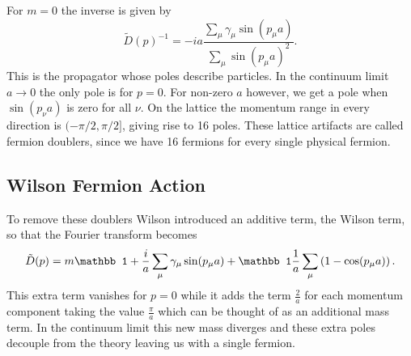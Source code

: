 For $m=0$ the inverse is given by
\begin{equation}
    \tilde D(p)^{-1}=-ia\frac{\sum_\mu\gamma_\mu\sin(p_\mu a)}{\sum_\mu\sin(p_\mu a)^2}.
\end{equation}
This is the propagator whose poles describe particles. In the continuum limit $a\to0$ the only pole is for $p=0$. For non-zero $a$ however, we get a pole when $\sin(p_\nu a)$ is zero for all $\nu$. On the lattice the momentum range in every direction is $(-\pi/2,\pi/2]$, giving rise to 16 poles. These lattice artifacts are called fermion doublers, since we have 16 fermions for every single physical fermion\cite{gattringer}. 


\subsection{Wilson Fermion Action}
To remove these doublers Wilson introduced an additive term, the Wilson term, so that the Fourier transform becomes
\begin{equation}
    \tilde D(p)=m\mathbb1+\frac{i}{a}\sum_\mu\gamma_\mu\sin(p_\mu a)+\mathbb1\frac{1}{a}\sum_\mu\rbr{1-\cos(p_\mu a)}.
\end{equation}
This extra term vanishes for $p=0$ while it adds the term $\frac2a$ for each momentum component taking the value $\frac{\pi}{a}$ which can be thought of as an additional mass term. In the continuum limit this new mass diverges and these extra poles decouple from the theory leaving us with a single fermion\cite{gattringer}.

